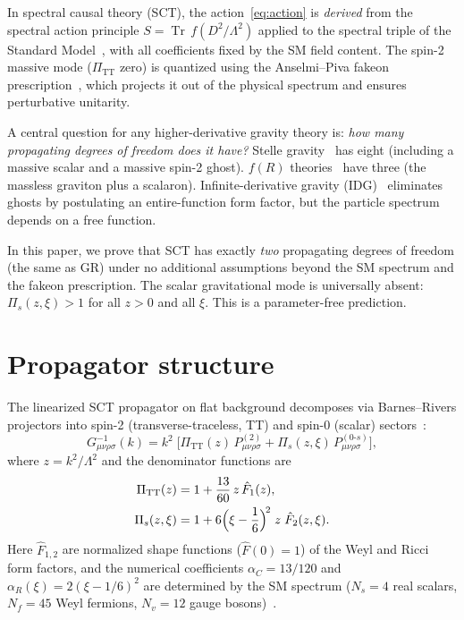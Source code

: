 \documentclass[12pt,a4paper]{article}
\newcommand{\Lam}{\Lambda}
\newcommand{\Tr}{\operatorname{Tr}}
\newcommand{\PiTT}{\Pi_{\mathrm{TT}}}
\newcommand{\Pis}{\Pi_{s}}
\newcommand{\alphaR}{\alpha_R}
\newcommand{\alphaC}{\alpha_C}
\begin{document}
In spectral causal theory (SCT), the action~\eqref{eq:action} is
\emph{derived} from the spectral action principle $S = \Tr\,f(D^2/\Lam^2)$
applied to the spectral triple of the Standard Model~\cite{CC1996,CCM2007},
with all coefficients fixed by the SM field content. The spin-2 massive
mode ($\PiTT$ zero) is quantized using the Anselmi--Piva fakeon
prescription~\cite{Anselmi2017,AP2018}, which projects it out of the
physical spectrum and ensures perturbative unitarity.

A central question for any higher-derivative gravity theory is:
\emph{how many propagating degrees of freedom does it have?}
Stelle gravity~\cite{Stelle1977} has eight (including a massive scalar
and a massive spin-2 ghost). $f(R)$ theories~\cite{Sotiriou2010} have
three (the massless graviton plus a scalaron).
Infinite-derivative gravity (IDG)~\cite{BMS2012} eliminates ghosts by
postulating an entire-function form factor, but the particle spectrum
depends on a free function.

In this paper, we prove that SCT has exactly \emph{two} propagating
degrees of freedom (the same as GR) under no additional assumptions
beyond the SM spectrum and the fakeon prescription. The scalar gravitational
mode is universally absent: $\Pis(z,\xi) > 1$ for all $z > 0$ and all $\xi$.
This is a parameter-free prediction.


\section{Propagator structure}
\label{sec:propagator}

The linearized SCT propagator on flat background decomposes via
Barnes--Rivers projectors into spin-2 (transverse-traceless, TT) and
spin-0 (scalar) sectors~\cite{Alfyorov2025a}:
\begin{equation}\label{eq:propagator}
  G^{-1}_{\mu\nu\rho\sigma}(k)
  = k^2\;\bigl[
    \PiTT(z)\,P^{(2)}_{\mu\nu\rho\sigma}
    + \Pis(z,\xi)\,P^{(0\text{-}s)}_{\mu\nu\rho\sigma}
  \bigr],
\end{equation}
where $z = k^2/\Lam^2$ and the denominator functions are
\begin{align}
  \PiTT(z) &= 1 + \frac{13}{60}\,z\,\hat{F}_1(z), \label{eq:PiTT} \\
  \Pis(z,\xi) &= 1 + 6\Bigl(\xi - \frac{1}{6}\Bigr)^{\!2}\;z\;\hat{F}_2(z,\xi).
    \label{eq:Pis}
\end{align}
Here $\hat{F}_{1,2}$ are normalized shape functions ($\hat{F}(0) = 1$)
of the Weyl and Ricci form factors, and the numerical coefficients
$\alphaC = 13/120$ and $\alphaR(\xi) = 2(\xi-1/6)^2$ are determined
by the SM spectrum ($N_s = 4$ real scalars, $N_f = 45$ Weyl fermions,
$N_v = 12$ gauge bosons)~\cite{Alfyorov2025a}.
\end{document}
